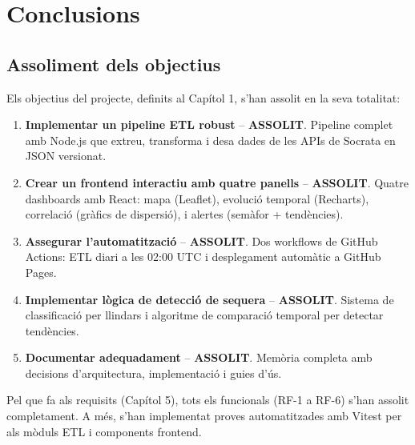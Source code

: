 

\chapter{Conclusions}
\label{Ch:Conclusions}


\section{Assoliment dels objectius}

Els objectius del projecte, definits al Capítol 1, s'han assolit en la seva totalitat:

\begin{enumerate}
    \item \textbf{Implementar un pipeline ETL robust} -- \textbf{ASSOLIT}. Pipeline complet amb Node.js que extreu, transforma i desa dades de les APIs de Socrata en JSON versionat.
    
    \item \textbf{Crear un frontend interactiu amb quatre panells} -- \textbf{ASSOLIT}. Quatre dashboards amb React: mapa (Leaflet), evolució temporal (Recharts), correlació (gràfics de dispersió), i alertes (semàfor + tendències).
    
    \item \textbf{Assegurar l'automatització} -- \textbf{ASSOLIT}. Dos workflows de GitHub Actions: ETL diari a les 02:00 UTC i desplegament automàtic a GitHub Pages.
    
    \item \textbf{Implementar lògica de detecció de sequera} -- \textbf{ASSOLIT}. Sistema de classificació per llindars i algoritme de comparació temporal per detectar tendències.
    
    \item \textbf{Documentar adequadament} -- \textbf{ASSOLIT}. Memòria completa amb decisions d'arquitectura, implementació i guies d'ús.
\end{enumerate}

Pel que fa als requisits (Capítol 5), tots els funcionals (RF-1 a RF-6) s'han assolit completament. A més, s'han implementat proves automatitzades amb Vitest per als mòduls ETL i components frontend.

